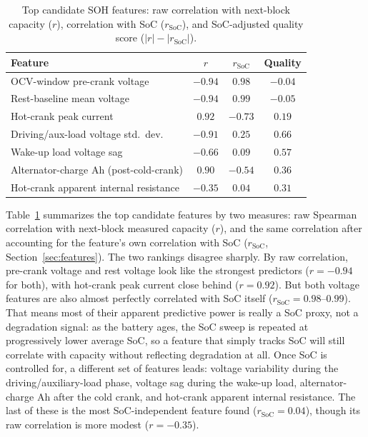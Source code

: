 \documentclass[conference]{IEEEtran}
\begin{document}
\begin{table}[htbp]
\centering
\caption{Top candidate SOH features: raw correlation with next-block capacity ($r$), correlation with SoC ($r_{\mathrm{SoC}}$), and SoC-adjusted quality score ($|r| - |r_{\mathrm{SoC}}|$).}
\label{tab:features}
\begin{tabular}{l c c c}
\hline
\textbf{Feature} & \textbf{$r$} & \textbf{$r_{\mathrm{SoC}}$} & \textbf{Quality} \\
\hline
OCV-window pre-crank voltage & $-0.94$ & $0.98$ & $-0.04$ \\
Rest-baseline mean voltage & $-0.94$ & $0.99$ & $-0.05$ \\
Hot-crank peak current & $0.92$ & $-0.73$ & $0.19$ \\
Driving/aux-load voltage std.\ dev. & $-0.91$ & $0.25$ & $0.66$ \\
Wake-up load voltage sag & $-0.66$ & $0.09$ & $0.57$ \\
Alternator-charge Ah (post-cold-crank) & $0.90$ & $-0.54$ & $0.36$ \\
Hot-crank apparent internal resistance & $-0.35$ & $0.04$ & $0.31$ \\
\hline
\end{tabular}
\end{table}

Table~\ref{tab:features} summarizes the top candidate features by two measures: raw Spearman correlation with next-block measured capacity ($r$), and the same correlation after accounting for the feature's own correlation with SoC ($r_{\mathrm{SoC}}$, Section~\ref{sec:features}). The two rankings disagree sharply. By raw correlation, pre-crank voltage and rest voltage look like the strongest predictors ($r=-0.94$ for both), with hot-crank peak current close behind ($r=0.92$). But both voltage features are also almost perfectly correlated with SoC itself ($r_{\mathrm{SoC}}=0.98$--$0.99$). That means most of their apparent predictive power is really a SoC proxy, not a degradation signal: as the battery ages, the SoC sweep is repeated at progressively lower average SoC, so a feature that simply tracks SoC will still correlate with capacity without reflecting degradation at all. Once SoC is controlled for, a different set of features leads: voltage variability during the driving/auxiliary-load phase, voltage sag during the wake-up load, alternator-charge Ah after the cold crank, and hot-crank apparent internal resistance. The last of these is the most SoC-independent feature found ($r_{\mathrm{SoC}}=0.04$), though its raw correlation is more modest ($r=-0.35$).
\end{document}
